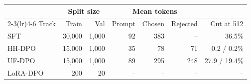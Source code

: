 \begin{tabular}{l r r r r r r}
\toprule
 & \multicolumn{2}{c}{Split size} & \multicolumn{3}{c}{Mean tokens} & \\
\cmidrule(lr){2-3}\cmidrule(lr){4-6}
Track & Train & Val & Prompt & Chosen & Rejected & Cut at 512 \\
\midrule
SFT & 30,000 & 1,000 & 92 & 383 & -- & 36.5\% \\
HH-DPO & 15,000 & 1,000 & 35 & 78 & 71 & 0.2 / 0.2\% \\
UF-DPO & 15,000 & 1,000 & 89 & 295 & 248 & 27.9 / 19.4\% \\
LoRA-DPO & 200 & 20 & -- & -- & -- & -- \\
\bottomrule
\end{tabular}
